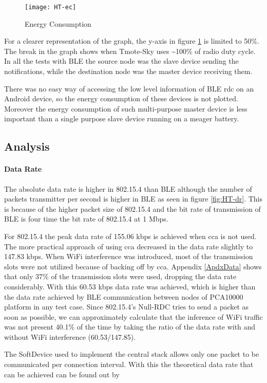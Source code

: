 \begin{figure}[h]
\texttt{[image: HT-ec]}
\caption{Energy Consumption}
\label{fig:HT-ec}
\end{figure}

For a clearer representation of the graph, the y-axis in figure \ref{fig:HT-ec} is limited to 50\%. The break in the graph shows when Tmote-Sky uses \textasciitilde100\% of radio duty cycle. In all the tests with BLE the source node was the slave device sending the notifications, while the destination node was the master device receiving them.

There was no easy way of accessing the low level information of BLE \gls{rdc} on an Android device, so the energy consumption of these devices is not plotted. Moreover the energy consumption of such multi-purpose master device is less important than a single purpose slave device running on a meager battery.

\subsection{Analysis}
\paragraph{Data Rate}
The absolute data rate is higher in 802.15.4 than BLE although the number of packets transmitter per second is higher in BLE as seen in figure \ref{fig:HT-dr}. This is because of the higher packet size of 802.15.4 and the bit rate of transmission of BLE is four time the bit rate of 802.15.4 at 1 Mbps.

For 802.15.4 the peak data rate of 155.06 kbps is achieved when \gls{cca} is not used. The more practical approach of using \gls{cca} decreased in the data rate slightly to 147.83 kbps. When WiFi interference was introduced, most of the transmission slots were not utilized because of backing off by \gls{cca}. Appendix \ref{ApdxData} shows that only 37\% of the transmission slots were used, dropping the data rate considerably. With this 60.53 kbps data rate was achieved, which is higher than the data rate achieved by BLE communication between nodes of PCA10000 platform in any test case. Since 802.15.4's Null-RDC tries to send a packet as soon as possible, we can approximately calculate that the inference of WiFi traffic was not present 40.1\% of the time by taking the ratio of the data rate with and without WiFi interference (60.53/147.85). 

The SoftDevice used to implement the central stack allows only one packet to be communicated per connection interval. With this the theoretical data rate that can be achieved can be found out by 

